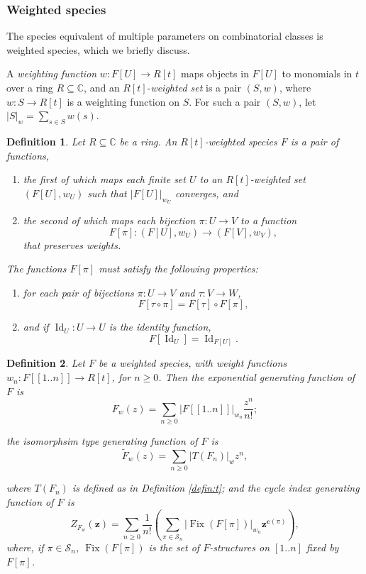 \documentclass[12pt]{article}
\theoremstyle{plain}
\newtheorem{defin}{Definition}
\DeclareMathOperator{\Fix}{Fix}
\DeclareMathOperator{\Id}{Id}
\begin{document}
\subsubsection{Weighted species}

The species equivalent of multiple parameters on combinatorial classes is weighted species, which we briefly discuss.

A \emph{weighting function} \( w: F[U] \rightarrow R[t] \) maps objects in \( F[U] \) to monomials in \( t \) over a ring \( R \subseteq \mathbb{C} \),
and an \( R[t] \)-\emph{weighted set} is a pair \( (S,w) \), where \( w: S \rightarrow R[t] \) is a weighting function on \( S \).
For such a pair \( (S,w) \), let \( |S|_w = \sum_{s \in S} w(s) \).


\begin{defin}
Let \( R \subseteq \mathbb{C} \) be a ring.
An \(R[t]\)-\emph{weighted species} \( F \) is a pair of functions,
\begin{enumerate}
 \item the first of which maps each finite set \(U\) to an \(R[t]\)-weighted set \( (F[U], w_U )\) such that \(|F[U]|_{w_U}\) converges, and
 \item the second of which maps each bijection \( \pi: U \rightarrow V \) to a function
\[ F[\pi]:(F[U], w_U) \rightarrow ( F[V], w_V ), \]
that preserves weights.
\end{enumerate}
The functions \( F[\pi] \) must satisfy the following properties:
\begin{enumerate}
 \item for each pair of bijections \( \pi : U \rightarrow V \) and \( \tau : V \rightarrow W \),
\[ F[\tau \circ \pi] = F[\tau] \circ F[\pi] , \]
 \item and if \(\Id_U:U \rightarrow U\) is the identity function,
\[ F[\Id_U] = \Id_{F[U]}.\]
\end{enumerate}
\end{defin}

\begin{defin}
Let \( F \) be a weighted species,
with weight functions \(w_n : F[[1..n]] \rightarrow R[t] \), for \( n \geq 0 \).
Then the exponential generating function of \( F \) is
\[ F_w(z) = \sum_{n \geq 0} |F[[1..n]]|_{w_n} \frac{z^n}{n!}; \]

\noindent the isomorphsim type generating function of \(F\) is
\[ \tilde{F}_w(z) = \sum_{n \geq 0} |T(F_n)|_w z^n, \]

\noindent where \( T(F_n) \) is defined as in Definition \ref{defin:t};
and the cycle index generating function of \( F \) is
\[ Z_{F_w}( \boldsymbol{z} ) = \sum_{n \geq 0} \frac{1}{n!} \left( \sum_{ \pi \in \mathcal{S}_n} |\Fix(F[\pi])|_{w_n} \boldsymbol{z}^{\boldsymbol{c}(\pi)} \right), \]
where, if \( \pi \in \mathcal{S}_n \),  \( \Fix(F[\pi]) \) is the set of \( F \)-structures on \( [1..n] \) fixed by \( F[\pi] \).
\end{defin}
\end{document}
